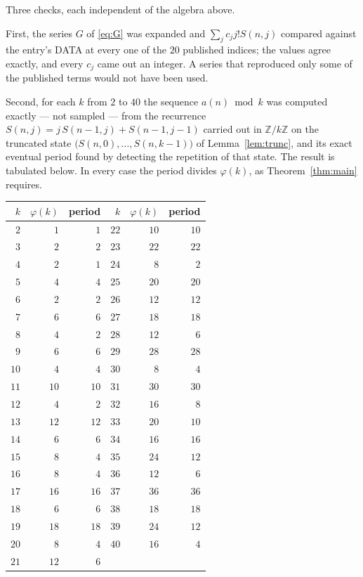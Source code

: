 \documentclass[11pt,a4paper]{article}
\theoremstyle{plain}
\theoremstyle{definition}
\begin{document}
Three checks, each independent of the algebra above.

First, the series $G$ of \eqref{eq:G} was expanded and $\sum_j c_j j! S(n,j)$ compared
against the entry's DATA at every one of the $20$ published indices; the values
agree exactly, and every $c_j$ came out an integer. A series that reproduced only some of
the published terms would not have been used.

Second, for each $k$ from $2$ to $40$ the sequence $a(n)\bmod k$ was computed exactly
--- not sampled --- from the recurrence $S(n,j)=j\,S(n-1,j)+S(n-1,j-1)$ carried out in
$\mathbb{Z}/k\mathbb{Z}$ on the truncated state
$\bigl(S(n,0),\dots,S(n,k-1)\bigr)$ of Lemma~\ref{lem:trunc}, and its exact eventual
period found by detecting the repetition of that state. The result is tabulated below.
In every case the period divides $\varphi(k)$, as Theorem~\ref{thm:main} requires.

\begin{center}\small
\begin{tabular}{rrr@{\qquad\qquad}rrr}
$k$ & $\varphi(k)$ & period & $k$ & $\varphi(k)$ & period \\ \hline
$2$ & $1$ & $1$ & $22$ & $10$ & $10$ \\
$3$ & $2$ & $2$ & $23$ & $22$ & $22$ \\
$4$ & $2$ & $1$ & $24$ & $8$ & $2$ \\
$5$ & $4$ & $4$ & $25$ & $20$ & $20$ \\
$6$ & $2$ & $2$ & $26$ & $12$ & $12$ \\
$7$ & $6$ & $6$ & $27$ & $18$ & $18$ \\
$8$ & $4$ & $2$ & $28$ & $12$ & $6$ \\
$9$ & $6$ & $6$ & $29$ & $28$ & $28$ \\
$10$ & $4$ & $4$ & $30$ & $8$ & $4$ \\
$11$ & $10$ & $10$ & $31$ & $30$ & $30$ \\
$12$ & $4$ & $2$ & $32$ & $16$ & $8$ \\
$13$ & $12$ & $12$ & $33$ & $20$ & $10$ \\
$14$ & $6$ & $6$ & $34$ & $16$ & $16$ \\
$15$ & $8$ & $4$ & $35$ & $24$ & $12$ \\
$16$ & $8$ & $4$ & $36$ & $12$ & $6$ \\
$17$ & $16$ & $16$ & $37$ & $36$ & $36$ \\
$18$ & $6$ & $6$ & $38$ & $18$ & $18$ \\
$19$ & $18$ & $18$ & $39$ & $24$ & $12$ \\
$20$ & $8$ & $4$ & $40$ & $16$ & $4$ \\
$21$ & $12$ & $6$ &  & & \\
\end{tabular}
\end{center}
\end{document}
